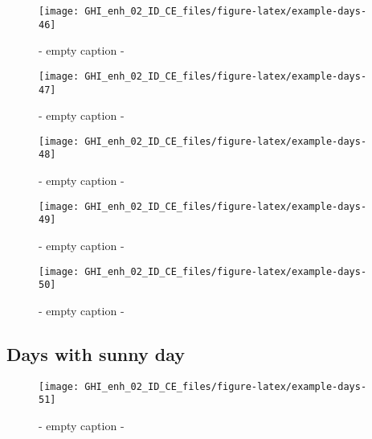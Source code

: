 \documentclass[
  10pt,
  a4paper,oneside]{article}
\begin{document}
\begin{figure}[H]

{\centering \texttt{[image: GHI\_enh\_02\_ID\_CE\_files/figure-latex/example-days-46]} 

}

\caption{ - empty caption - }\label{fig:example-days-46}
\end{figure}

\begin{figure}[H]

{\centering \texttt{[image: GHI\_enh\_02\_ID\_CE\_files/figure-latex/example-days-47]} 

}

\caption{ - empty caption - }\label{fig:example-days-47}
\end{figure}

\begin{figure}[H]

{\centering \texttt{[image: GHI\_enh\_02\_ID\_CE\_files/figure-latex/example-days-48]} 

}

\caption{ - empty caption - }\label{fig:example-days-48}
\end{figure}

\begin{figure}[H]

{\centering \texttt{[image: GHI\_enh\_02\_ID\_CE\_files/figure-latex/example-days-49]} 

}

\caption{ - empty caption - }\label{fig:example-days-49}
\end{figure}

\begin{figure}[H]

{\centering \texttt{[image: GHI\_enh\_02\_ID\_CE\_files/figure-latex/example-days-50]} 

}

\caption{ - empty caption - }\label{fig:example-days-50}
\end{figure}

\FloatBarrier

\hypertarget{days-with-sunny-day}{%
\subsection{Days with sunny day}\label{days-with-sunny-day}}

\begin{figure}[H]

{\centering \texttt{[image: GHI\_enh\_02\_ID\_CE\_files/figure-latex/example-days-51]} 

}

\caption{ - empty caption - }\label{fig:example-days-51}
\end{figure}
\end{document}
